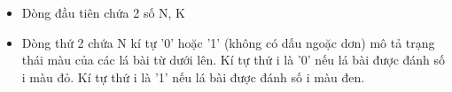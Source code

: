 \begin{itemize}
	\item     Dòng đầu tiên chứa 2 số N, K   
	\item     Dòng thứ 2 chứa N kí tự '0' hoặc '1' (không có dấu ngoặc dơn) mô tả trạng thái màu của các lá bài từ dưới lên. Kí tự thứ i là '0' nếu lá bài được đánh số i màu đỏ. Kí tự thứ i là '1' nếu lá bài được đánh số i màu đen.   
\end{itemize}